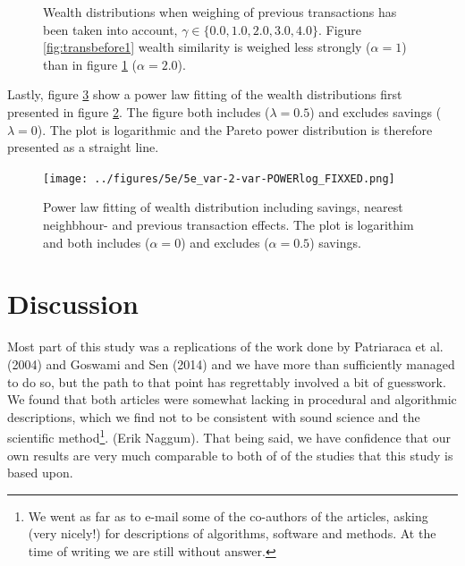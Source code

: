 \documentclass[10pt, a4paper]{amsart}
\begin{document}
\begin{figure}
\begin{subfigure}{.49\textwidth}
	\caption{}
	\label{fig:transbefore2}
\end{subfigure}
\caption{Wealth distributions when weighing of previous transactions has been taken into account, $\gamma\in\{0.0, 1.0, 2.0, 3.0, 4.0\}$. Figure \ref{fig:transbefore1} wealth similarity is weighed less strongly ($\alpha=1$) than in figure \ref{fig:transbefore2} ($\alpha=2.0$).}
\label{fig:transbefore}
\end{figure}

Lastly, figure \ref{fig:transbeforefit} show a power law fitting of the wealth distributions first presented in figure \ref{fig:transbefore}. The figure both includes ($\lambda=0.5$) and excludes savings ($\lambda=0$). The plot is logarithmic and the Pareto power distribution is therefore presented as a straight line. 

\begin{figure}
	\centering
	\texttt{[image: ../figures/5e/5e\_var-2-var-POWERlog\_FIXXED.png]}
	\caption{Power law fitting of wealth distribution including savings, nearest neighbhour- and previous transaction effects. The plot is logarithim and both includes ($\alpha=0$) and excludes ($\alpha=0.5$) savings.}
	\label{fig:transbeforefit}
\end{figure}

\section{Discussion}
Most part of this study was a replications of the work done by Patriaraca et al. (2004)\cite{Patriarca} and Goswami and Sen (2014)\cite{GoswamiSen} and we have more than sufficiently managed to do so, but the path to that point has regrettably involved a bit of guesswork. We found that both articles were somewhat lacking in procedural and algorithmic descriptions, which we find not to be consistent with sound science and the scientific method\footnote{We went as far as to e-mail some of the co-authors of the articles, asking (very nicely!) for descriptions of algorithms, software and methods. At the time of writing we are still without answer.}.  (Erik Naggum)\cite{Rendering}. That being said, we have confidence that our own results are very much comparable to both of of the studies that this study is based upon. 
\end{document}
